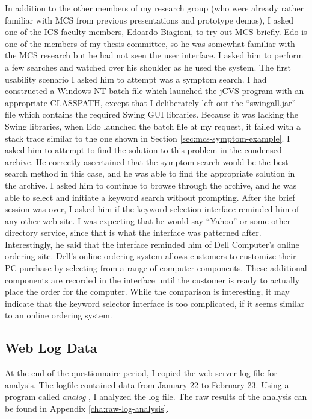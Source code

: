 In addition to the other members of my research group (who were already rather
familiar with MCS from previous presentations and prototype demos), I asked one
of the ICS faculty members, Edoardo Biagioni, to try out MCS briefly. Edo is
one of the members of my thesis committee, so he was somewhat familiar with the
MCS research but he had not seen the user interface. I asked him to perform a
few searches and watched over his shoulder as he used the system. The first
usability scenario I asked him to attempt was a symptom search. I had
constructed a Windows NT batch file which launched the jCVS program with an
appropriate CLASSPATH, except that I deliberately left out the ``swingall.jar''
file which contains the required Swing GUI libraries. Because it was lacking
the Swing libraries, when Edo launched the batch file at my request, it failed
with a stack trace similar to the one shown in Section
\ref{sec:mcs-symptom-example}. I asked him to attempt to find the solution to
this problem in the condensed archive. He correctly ascertained that the
symptom search would be the best search method in this case, and he was able to
find the appropriate solution in the archive. I asked him to continue to browse
through the archive, and he was able to select and initiate a keyword search
without prompting. After the brief session was over, I asked him if the keyword
selection interface reminded him of any other web site. I was expecting that he
would say ``Yahoo'' or some other directory service, since that is what the
interface was patterned after.  Interestingly, he said that the interface
reminded him of Dell Computer's online ordering site. Dell's online ordering
system allows customers to customize their PC purchase by selecting from a
range of computer components.  These additional components are recorded in the
interface until the customer is ready to actually place the order for the
computer. While the comparison is interesting, it may indicate that the keyword
selector interface is too complicated, if it seems similar to an online
ordering system.

\subsection{Web Log Data}
\label{sec:web-log-data}
At the end of the questionnaire period, I copied the web server log file for
analysis. The logfile contained data from January 22 to February 23. Using a
program called {\it analog} \cite{analog-program}, I analyzed the log file. The
raw results of the analysis can be found in Appendix
\ref{cha:raw-log-analysis}.

